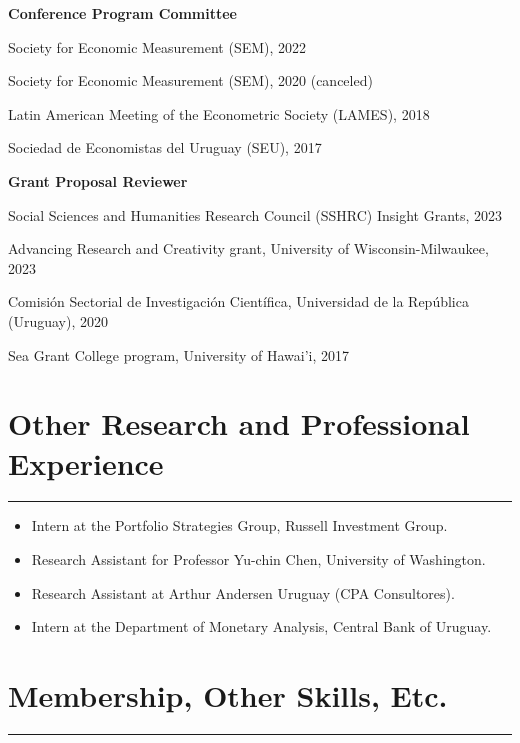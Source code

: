 \documentclass[overlapped,letterpaper,11pt]{res}
\newcommand{\cvrule}{%
  \hspace*{-\sectionwidth}%
  \rule[2mm]{\dimexpr\textwidth+\sectionwidth\relax}{.25pt}}
\newcommand{\cvsection}[1]{%
  \needspace{4\baselineskip}%
  \section{\textbf{#1}}%
  \cvrule}
\newenvironment{list1}{
  \begin{list}{\textendash}{%
      \setlength{\itemsep}{0in}
      \setlength{\parsep}{0in} \setlength{\parskip}{0in}
      \setlength{\topsep}{0in} \setlength{\partopsep}{0in}
      \setlength{\leftmargin}{0.17in}}}{\end{list}
}
\begin{document}
\begin{resume}
\begin{itemize}
	\item \textbf{Conference Program Committee}
		\begin{list1}
			\item[-] Society for Economic Measurement (SEM), 2022
			\item[-] Society for Economic Measurement (SEM), 2020 (canceled)
			\item[-] Latin American Meeting of the Econometric Society (LAMES), 2018
			\item[-] Sociedad de Economistas del Uruguay (SEU), 2017
		\end{list1}

	\item \textbf{Grant Proposal Reviewer}
		\begin{list1}
			\item[-] Social Sciences and Humanities Research Council (SSHRC) Insight Grants, 2023
			\item[-] Advancing Research and Creativity grant, University of Wisconsin-Milwaukee, 2023
			\item[-] Comisi\'on Sectorial de Investigaci\'on Cient\'ifica, Universidad de la Rep\'ublica (Uruguay), 2020
			\item[-] Sea Grant College program, University of Hawai'i, 2017
		\end{list1}

\end{itemize}

\cvsection{Other Research and Professional Experience}
\begin{itemize}
\item [2007] Intern at the Portfolio Strategies Group, Russell Investment Group.
\item [2006] Research Assistant for Professor Yu-chin Chen, University of Washington.
\item [2001] Research Assistant at Arthur Andersen Uruguay (CPA Consultores).
\item [2000] Intern at the Department of Monetary Analysis, Central Bank of Uruguay.
\end{itemize}

\cvsection{Membership, Other Skills, Etc.}
\begin{itemize}



\end{itemize}
\end{resume}
\end{document}
